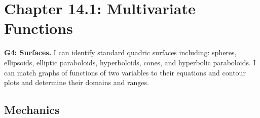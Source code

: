 
\fancyhead[R]{\dayseven}

\section*{\centering Chapter 14.1: Multivariate Functions}

\textbf{G4: Surfaces.} I can identify standard quadric surfaces including: spheres, ellipsoids, elliptic paraboloids, hyperboloids, cones, and hyperbolic paraboloids. I can match graphs of functions of two variables to their equations and contour plots and determine their domains and ranges.

\vspace{-.5cm}
\subsection*{Mechanics}
